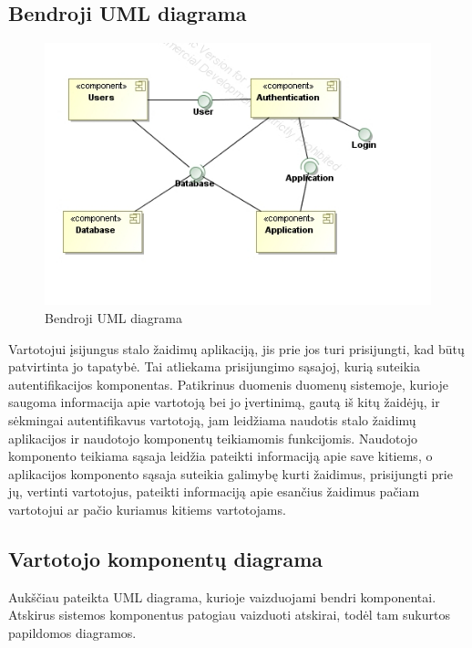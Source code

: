 \documentclass{VUMIFPSkursinis}
\begin{document}
	\subsection{Bendroji UML diagrama}
		\begin{figure}[H]
			\centering
			\includegraphics[scale=0.6]{img/UMLComponent1}
			\caption{Bendroji UML diagrama}
			\label{img:UMLComponent1}
		\end{figure}
		Vartotojui įsijungus stalo žaidimų aplikaciją, jis prie jos turi prisijungti, kad būtų patvirtinta jo tapatybė. Tai atliekama prisijungimo sąsajoj, kurią suteikia autentifikacijos komponentas. Patikrinus duomenis duomenų sistemoje, kurioje saugoma informacija apie vartotoją bei jo įvertinimą, gautą iš kitų žaidėjų, ir sėkmingai autentifikavus vartotoją, jam leidžiama naudotis stalo žaidimų aplikacijos ir naudotojo komponentų teikiamomis funkcijomis. Naudotojo komponento teikiama sąsaja leidžia pateikti informaciją apie save kitiems, o aplikacijos komponento sąsaja suteikia galimybę kurti žaidimus, prisijungti prie jų, vertinti vartotojus, pateikti informaciją apie esančius žaidimus pačiam vartotojui ar pačio kuriamus kitiems vartotojams.
		
		\subsection{Vartotojo komponentų diagrama}
		Aukščiau pateikta UML diagrama, kurioje vaizduojami bendri komponentai. Atskirus sistemos komponentus patogiau vaizduoti atskirai, todėl tam sukurtos papildomos diagramos.
		
\end{document}

